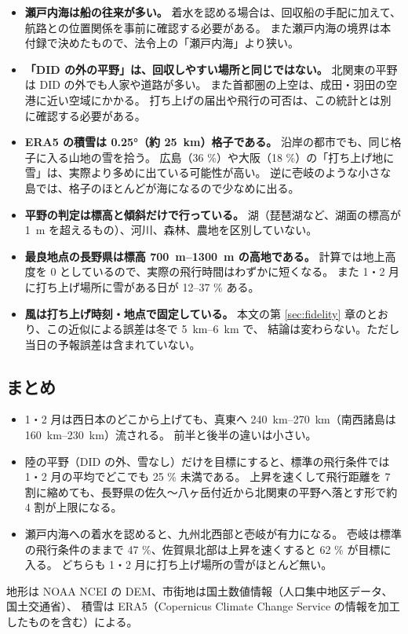 \begin{itemize}
  \item \textbf{瀬戸内海は船の往来が多い。}
        着水を認める場合は、回収船の手配に加えて、航路との位置関係を事前に確認する必要がある。
        また瀬戸内海の境界は本付録で決めたもので、法令上の「瀬戸内海」より狭い。
  \item \textbf{「DID の外の平野」は、回収しやすい場所と同じではない。}
        北関東の平野は DID の外でも人家や道路が多い。
        また首都圏の上空は、成田・羽田の空港に近い空域にかかる。
        打ち上げの届出や飛行の可否は、この統計とは別に確認する必要がある。
  \item \textbf{ERA5 の積雪は \ang{0.25}（約 \SI{25}{\kilo\metre}）格子である。}
        沿岸の都市でも、同じ格子に入る山地の雪を拾う。
        広島（36 \%）や大阪（18 \%）の「打ち上げ地に雪」は、実際より多めに出ている可能性が高い。
        逆に壱岐のような小さな島では、格子のほとんどが海になるので少なめに出る。
  \item \textbf{平野の判定は標高と傾斜だけで行っている。}
        湖（琵琶湖など、湖面の標高が \SI{1}{\metre} を超えるもの）、河川、森林、農地を区別していない。
  \item \textbf{最良地点の長野県は標高 \SIrange{700}{1300}{\metre} の高地である。}
        計算では地上高度を 0 としているので、実際の飛行時間はわずかに短くなる。
        また 1・2 月に打ち上げ場所に雪がある日が 12--37 \% ある。
  \item \textbf{風は打ち上げ時刻・地点で固定している。}
        本文の第 \ref{sec:fidelity} 章のとおり、この近似による誤差は冬で \SIrange{5}{6}{\kilo\metre} で、
        結論は変わらない。ただし当日の予報誤差は含まれていない。
\end{itemize}

\subsection{まとめ}

\begin{itemize}
  \item 1・2 月は西日本のどこから上げても、真東へ \SIrange{240}{270}{\kilo\metre}（南西諸島は \SIrange{160}{230}{\kilo\metre}）流される。
        前半と後半の違いは小さい。
  \item 陸の平野（DID の外、雪なし）だけを目標にすると、標準の飛行条件では 1・2 月の平均でどこでも 25 \% 未満である。
        上昇を速くして飛行距離を 7 割に縮めても、長野県の佐久〜八ヶ岳付近から北関東の平野へ落とす形で約 4 割が上限になる。
  \item 瀬戸内海への着水を認めると、九州北西部と壱岐が有力になる。
        壱岐は標準の飛行条件のままで 47 \%、佐賀県北部は上昇を速くすると 62 \% が目標に入る。
        どちらも 1・2 月に打ち上げ場所の雪がほとんど無い。
\end{itemize}

地形は NOAA NCEI の DEM、市街地は国土数値情報（人口集中地区データ、国土交通省）、
積雪は ERA5（Copernicus Climate Change Service の情報を加工したものを含む）による。
